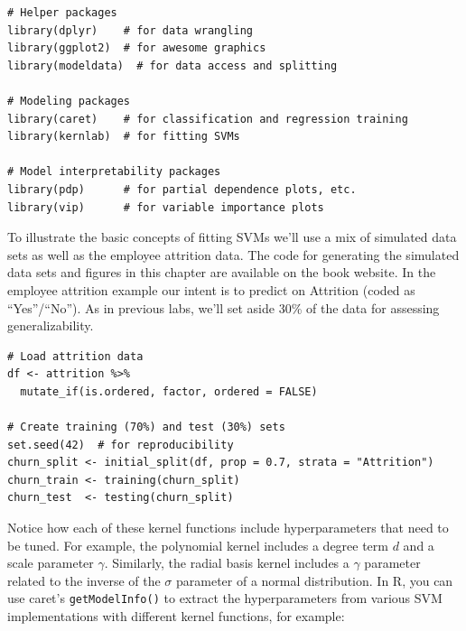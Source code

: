 \documentclass{article}
\begin{document}
\begin{listing}[H]
    \begin{verbatim}
# Helper packages
library(dplyr)    # for data wrangling
library(ggplot2)  # for awesome graphics
library(modeldata)  # for data access and splitting

# Modeling packages
library(caret)    # for classification and regression training
library(kernlab)  # for fitting SVMs

# Model interpretability packages
library(pdp)      # for partial dependence plots, etc.
library(vip)      # for variable importance plots
    \end{verbatim}
    \caption{Package Initialization: Loading essential libraries for data wrangling, visualization, and SVM modelling.}
\end{listing}

To illustrate the basic concepts of fitting SVMs we’ll use a mix of simulated data sets as well as the employee attrition data. The code for generating the simulated data sets and figures in this chapter are available on the book website. In the employee attrition example our intent is to predict on Attrition (coded as ``Yes''/``No''). As in previous labs, we’ll set aside 30\% of the data for assessing generalizability.

\begin{listing}[H]
    \begin{verbatim}
# Load attrition data
df <- attrition %>%
  mutate_if(is.ordered, factor, ordered = FALSE)

# Create training (70%) and test (30%) sets
set.seed(42)  # for reproducibility
churn_split <- initial_split(df, prop = 0.7, strata = "Attrition")
churn_train <- training(churn_split)
churn_test  <- testing(churn_split)
    \end{verbatim}
    \caption{Data Preparation: Formatting the ``attrition'' dataset and partitioning it into 70\% training and 30\% testing sets.}
\end{listing}

Notice how each of these kernel functions include hyperparameters that need to be tuned. For example, the polynomial kernel includes a degree term $d$ and a scale parameter  $\gamma$. Similarly, the radial basis kernel includes a $\gamma$ parameter related to the inverse of the $\sigma$ parameter of a normal distribution. In R, you can use caret’s \texttt{getModelInfo()} to extract the hyperparameters from various SVM implementations with different kernel functions, for example:
\end{document}
